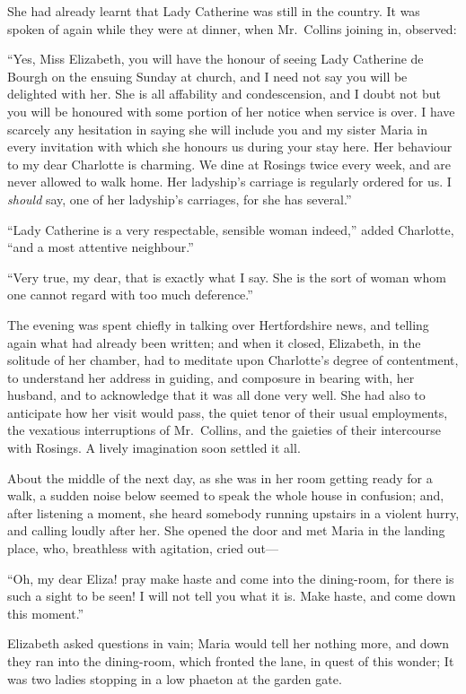 \documentclass[12pt,english,oneside]{book}
\begin{document}
She had already learnt that Lady Catherine was still in the country.
It was spoken of again while they were at dinner, when Mr.\ Collins
joining in, observed:

{}``Yes, Miss Elizabeth, you will have the honour of seeing Lady
Catherine de Bourgh on the ensuing Sunday at church, and I need not
say you will be delighted with her. She is all affability and condescension,
and I doubt not but you will be honoured with some portion of her
notice when service is over. I have scarcely any hesitation in saying
she will include you and my sister Maria in every invitation with
which she honours us during your stay here. Her behaviour to my dear
Charlotte is charming. We dine at Rosings twice every week, and are
never allowed to walk home. Her ladyship's carriage is regularly ordered
for us. I \textit{should} say, one of her ladyship's carriages, for
she has several.''

{}``Lady Catherine is a very respectable, sensible woman indeed,''
added Charlotte, {}``and a most attentive neighbour.''

{}``Very true, my dear, that is exactly what I say. She is the sort
of woman whom one cannot regard with too much deference.''

The evening was spent chiefly in talking over Hertfordshire news,
and telling again what had already been written; and when it closed,
Elizabeth, in the solitude of her chamber, had to meditate upon Charlotte's
degree of contentment, to understand her address in guiding, and composure
in bearing with, her husband, and to acknowledge that it was all done
very well. She had also to anticipate how her visit would pass, the
quiet tenor of their usual employments, the vexatious interruptions
of Mr.\ Collins, and the gaieties of their intercourse with Rosings.
A lively imagination soon settled it all.

About the middle of the next day, as she was in her room getting ready
for a walk, a sudden noise below seemed to speak the whole house in
confusion; and, after listening a moment, she heard somebody running
upstairs in a violent hurry, and calling loudly after her. She opened
the door and met Maria in the landing place, who, breathless with
agitation, cried out\mbox{---}

{}``Oh, my dear Eliza! pray make haste and come into the dining-room,
for there is such a sight to be seen! I will not tell you what it
is. Make haste, and come down this moment.''

Elizabeth asked questions in vain; Maria would tell her nothing more,
and down they ran into the dining-room, which fronted the lane, in
quest of this wonder; It was two ladies stopping in a low phaeton
at the garden gate.
\end{document}
